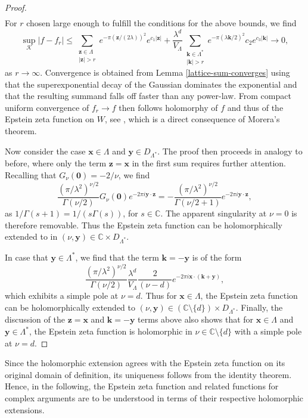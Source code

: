 \documentclass[]{amsart}
\newcommand{\new}[1]{#1}
\numberwithin{mythm}{section}
\begin{document}
\begin{proof}
\begin{align*}
\end{align*}
For $r$ chosen large enough to fulfill the conditions for the above bounds, we find
\[
\sup_{\mathcal K}\vert f-f_r| \le \sum_{\substack{\bm{z}\in\Lambda \\ |\bm z|>r}} e^{-\pi (\bm z/(2\lambda))^2}e^{c_1 \vert \bm z\vert}+\frac{\lambda^d}{V_\Lambda}\sum_{\substack{\bm{k}\in\Lambda^\ast \\ |\bm k|>r}} e^{-\pi (\lambda \bm k/2)^2} c_2 e^{c_3 \vert \bm k\vert} \to 0,
\]
as $r\to \infty$.
Convergence is obtained from 
Lemma \ref{lattice-sum-converges} using that the superexponential decay of the Gaussian dominates the exponential and that the resulting summand falls off faster than any power-law. From compact uniform convergence of $f_r\to f$ then follows holomorphy of $f$ and thus of the Epstein zeta function on $W$, see \cite[Theorem 10.28]{rudin1987real}, which is a direct consequence of Morera's theorem. 

Now consider the case $\bm x\in \Lambda$ and $\bm y \in D_{\Lambda^\ast}$. The proof then proceeds in analogy to before, where only the term  $\bm z=\bm x$ in the first sum requires further attention. Recalling that $G_\nu(\bm 0)=-2/\nu$, we find
$$
\frac{(\pi/\lambda^2 )^{\nu/2}}{\Gamma(\nu/2)} G_\nu(\bm 0) e^{-2\pi i \bm y\cdot \bm z} = -\frac{(\pi/\lambda^2 )^{\nu/2}}{\Gamma(\nu/2+1)}e^{-2\pi i \bm y\cdot \bm z},$$
as $1/\Gamma(s+1)=1/(s\Gamma(s))$, for $s\in \mathds C$.
The apparent singularity at \(\nu=0\) is therefore removable. Thus the Epstein zeta function
\new{can be holomorphically extended to}
in $(\nu,\bm y) \in \mathds C\times D_{\Lambda^\ast}$.

In case that $\bm y\in\Lambda^*$, we find that the term $\bm k = -\bm y$ is of the form
\[
\frac{(\pi/\lambda^2 )^{\nu/2}}{\Gamma(\nu/2)}
\frac{\lambda^d}{V_{\Lambda}}
\frac{2}{(\nu-d)}e^{-2\pi i\bm{x}\cdot(\bm{k}+\bm{y})},
\]
which exhibits a simple pole at $\nu = d$. Thus for $\bm x\in \Lambda$, the Epstein zeta function 
\new{can be holomorphically extended to}
$(\nu, \bm y)\in (\mathds C\setminus \{d\})\times D_{\Lambda^\ast}$. Finally, the discussion of the $\bm z = \bm x$ and $\bm k = -\bm y$ terms above also shows that for $\bm x \in \Lambda$ and $\bm y\in \Lambda^\ast$, the Epstein zeta function is holomorphic in $\nu \in \mathds C\setminus\{d\}$ with a simple pole at $\nu = d$.
\end{proof}

\new{Since the holomorphic extension agrees with the Epstein zeta function on its original domain of definition, its uniqueness follows from the identity theorem. Hence, in the following, the Epstein zeta function and related functions for complex arguments are to be understood in terms of their respective holomorphic extensions.}
\end{document}
